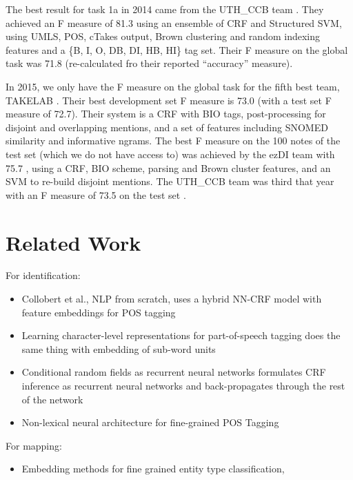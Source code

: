 \documentclass[10pt,a4paper]{article}
\begin{document}
  The best result for task 1a in 2014 came from the UTH\_CCB team \cite{tang2014uth_ccb}. They achieved an F measure of 81.3 using an ensemble of CRF and Structured SVM, using UMLS, POS, cTakes output, Brown clustering and random indexing features and a \{B, I, O, DB, DI, HB, HI\} tag set. Their F measure on the global task was 71.8 (re-calculated fro their reported ``accuracy'' measure).
  
  In 2015, we only have the F measure on the global task for the fifth best team, TAKELAB \cite{glavavstakelab}. Their best development set F measure is 73.0 (with a test set F measure of 72.7). Their system is a CRF with BIO tags, post-processing for disjoint and overlapping mentions, and a set of features including SNOMED similarity and informative ngrams. The best F measure on the 100 notes of the test set (which we do not have access to) was achieved by the ezDI team with 75.7 \cite{pathak2015ezdi}, using a CRF, BIO scheme, parsing and Brown cluster features, and an SVM to re-build disjoint mentions. The UTH\_CCB team was third that year with an F measure of 73.5 on the test set \cite{xu2015uth}.
  

\section{Related Work}

For identification:
\begin{itemize}
\item Collobert et al., NLP from scratch, uses a hybrid NN-CRF model with feature embeddings for POS tagging \cite{collobert2011natural}
\item Learning character-level representations for part-of-speech tagging does the same thing with embedding of sub-word units \cite{santos2014learning}
\item Conditional random fields as recurrent neural networks formulates CRF inference as recurrent neural networks and back-propagates through the rest of the network \cite{zheng2015conditional}
\item Non-lexical neural architecture for fine-grained POS Tagging \cite{labeau2015non}
\end{itemize}

For mapping:
\begin{itemize}
\item Embedding methods for fine grained entity type classification, \cite{yogatama2015embedding} 
\end{itemize}
\end{document}
